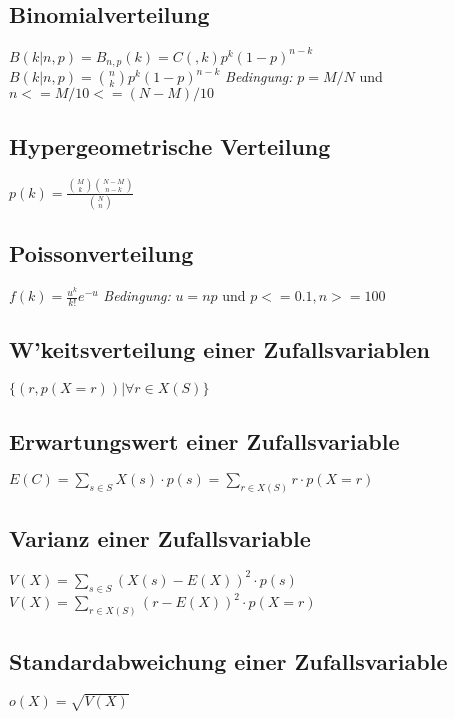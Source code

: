 \subsection{Binomialverteilung}
$ B(k|n, p) = B_{n,p}(k) = C(, k) p^k (1-p)^{n-k} $
\newline
$ B(k|n, p) = \binom{n}{k} p^k (1-p)^{n-k} $
\newline
\newline
\textit{Bedingung:}
\newline
$ p = M/N $ und $ n <= M/10 <= (N - M) / 10 $

\subsection{Hypergeometrische Verteilung}
$ p(k) = \frac{\binom{M}{k} \binom{N-M}{n-k}}{\binom{N}{n}} $

\subsection{Poissonverteilung}
$ f(k) = \frac{u^k}{k!} e^{-u} $
\newline
\newline
\textit{Bedingung:}
\newline
$ u = np $ und $ p <= 0.1, n >= 100 $

\subsection{W'keitsverteilung einer Zufallsvariablen}
$ \{ (r, p(X = r)) | \forall r \in X(S) \} $

\subsection{Erwartungswert einer Zufallsvariable}
$ E(C) = \sum_{s \in S} X(s) \cdot p(s) = \sum_{r \in X(S)} r \cdot p(X = r) $

\subsection{Varianz einer Zufallsvariable}
$ V(X) = \sum_{s \in S} (X(s) - E(X))^2 \cdot p(s) $ 
\newline 
 $ V(X) = \sum_{r \in X(S)} (r - E(X))^2 \cdot p(X = r) $

\subsection{Standardabweichung einer Zufallsvariable}
$ o(X) = \sqrt{V(X)} $
